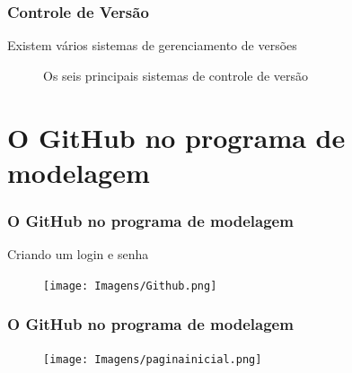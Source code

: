 \documentclass[10pt]{beamer} %
\begin{document}
\begin{frame}
	\frametitle{Controle de Versão}
	
	
\begin{block}{Existem vários sistemas de gerenciamento de versões}
		
\begin{figure}[h]

\center
{}
\qquad
{}
\qquad
{}
\qquad
{}
\qquad
{}
\qquad
{}
\caption{Os seis principais sistemas de controle de versão}

\end{figure}
	
\end{block}
	
\end{frame}




\section{O GitHub no programa de modelagem}

\begin{frame}
\frametitle{O GitHub no programa de modelagem}

\begin{block}{Criando um login e senha}
\begin{figure}[H]
\centering
\texttt{[image: Imagens/Github.png]}
\end{figure}

\end{block}
\end{frame}

\begin{frame}
\frametitle{O GitHub no programa de modelagem}

\begin{block}{}
\begin{figure}[H]
\centering
\texttt{[image: Imagens/paginainicial.png]}
\end{figure}

\end{block}
\end{frame}
\end{document}
